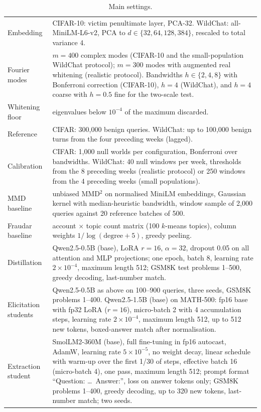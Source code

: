 \begin{table}[h]
\centering
\caption{Main settings.}
\small
\begin{tabular}{p{}p{}}
\toprule
Embedding & CIFAR-10: victim penultimate layer, PCA-32. WildChat: all-MiniLM-L6-v2, PCA to $d\in\{32,64,128,384\}$, rescaled to total variance 4. \\
Fourier modes & $m=400$ complex modes (CIFAR-10 and the small-population WildChat protocol); $m=300$ modes with augmented real whitening (realistic protocol). Bandwidths $h\in\{2,4,8\}$ with Bonferroni correction (CIFAR-10), $h=4$ (WildChat), and $h=4$ coarse with $h=0.5$ fine for the two-scale test. \\
Whitening floor & eigenvalues below $10^{-4}$ of the maximum discarded. \\
Reference & CIFAR: 300{,}000 benign queries. WildChat: up to 100{,}000 benign turns from the four preceding weeks (lagged). \\
Calibration & CIFAR: 1{,}000 null worlds per configuration, Bonferroni over bandwidths. WildChat: 40 null windows per week, thresholds from the 8 preceding weeks (realistic protocol) or 250 windows from the 4 preceding weeks (small populations). \\
MMD baseline & unbiased MMD$^2$ on normalised MiniLM embeddings, Gaussian kernel with median-heuristic bandwidth, window sample of 2{,}000 queries against 20 reference batches of 500. \\
Fraudar baseline & account $\times$ topic count matrix (100 $k$-means topics), column weights $1/\log(\text{degree}+5)$, greedy peeling. \\
Distillation & Qwen2.5-0.5B (base), LoRA $r=16$, $\alpha=32$, dropout 0.05 on all attention and MLP projections; one epoch, batch 8, learning rate $2\times10^{-4}$, maximum length 512; GSM8K test problems 1--500, greedy decoding, last-number match. \\
Elicitation students & Qwen2.5-0.5B as above on 100--900 queries, three seeds, GSM8K problems 1--400. Qwen2.5-1.5B (base) on MATH-500: fp16 base with fp32 LoRA ($r=16$), micro-batch 2 with 4 accumulation steps, learning rate $2\times10^{-4}$, maximum length 512, up to 512 new tokens, boxed-answer match after normalisation. \\
Extraction student & SmolLM2-360M (base), full fine-tuning in fp16 autocast, AdamW, learning rate $5\times10^{-5}$, no weight decay, linear schedule with warm-up over the first 1/30 of steps, effective batch 16 (micro-batch 4), one pass, maximum length 512; prompt format ``Question: \ldots\ Answer:'', loss on answer tokens only; GSM8K problems 1--400, greedy decoding, up to 320 new tokens, last-number match; two seeds. \\

\end{tabular}
\end{table}
